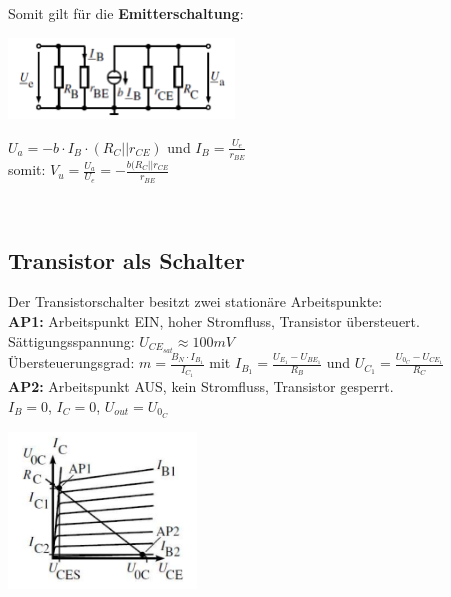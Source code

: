 		Somit gilt für die \textbf{Emitterschaltung}: \\
		\begin{minipage}[c]{6cm}
			\includegraphics[width=6cm]{images/emittersch-esb}
		\end{minipage}
		\begin{minipage}[c]{12cm}
			$U_a = -b \cdot I_B \cdot (R_C || r_{CE})$ und $I_B=\frac{U_e}{r_{BE}}$ \\
			somit: $V_u = \frac{U_a}{U_e} = -\frac{b(R_C || r_{CE}}{r_{BE}}$ 
		\end{minipage} \\
		
	\subsection{Transistor als Schalter}
		\begin{minipage}[c]{12cm}
			Der Transistorschalter besitzt zwei stationäre Arbeitspunkte: \\
			
			\textbf{AP1:} Arbeitspunkt EIN, hoher Stromfluss, Transistor übersteuert. \\
			Sättigungsspannung: $U_{CE_{sat}} \approx 100mV$ \\
			Übersteuerungsgrad: $m = \frac{B_N \cdot I_{B_1}}{I_{C_1}}$ mit
			$I_{B_1}=\frac{U_{E_1}-U_{BE_1}}{R_B}$ und $U_{C_1}=\frac{U_{0_C}-U_{CE_1}}{R_C}$ \\
			
			\textbf{AP2:} Arbeitspunkt AUS, kein Stromfluss, Transistor gesperrt. \\
			$I_B = 0$, $I_C = 0$, $U_{out} = U_{0_C}$
		\end{minipage}
		\begin{minipage}[c]{5cm}
			\includegraphics[width=5cm]{images/bip-schalter-ap}
		\end{minipage} \\
		
